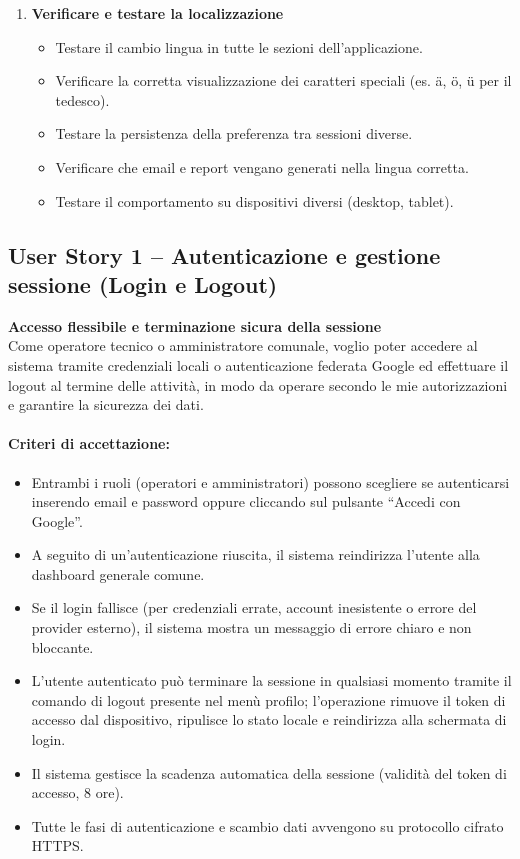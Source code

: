 \begin{enumerate}
    \item \textbf{Verificare e testare la localizzazione}
    \begin{itemize}
        \item Testare il cambio lingua in tutte le sezioni dell'applicazione.
        \item Verificare la corretta visualizzazione dei caratteri speciali (es. ä, ö, ü per il tedesco).
        \item Testare la persistenza della preferenza tra sessioni diverse.
        \item Verificare che email e report vengano generati nella lingua corretta.
        \item Testare il comportamento su dispositivi diversi (desktop, tablet).
    \end{itemize}
\end{enumerate}

\subsection{User Story 1 – Autenticazione e gestione sessione (Login e Logout)}
\label{us:login}

\textbf{Accesso flessibile e terminazione sicura della sessione} \\
Come operatore tecnico o amministratore comunale, voglio poter accedere al sistema tramite credenziali locali o autenticazione federata Google ed effettuare il logout al termine delle attività, in modo da operare secondo le mie autorizzazioni e garantire la sicurezza dei dati.

\paragraph*{Criteri di accettazione:}
\begin{itemize}
    \item Entrambi i ruoli (operatori e amministratori) possono scegliere se autenticarsi inserendo email e password oppure cliccando sul pulsante ``Accedi con Google''.
    \item A seguito di un'autenticazione riuscita, il sistema reindirizza l'utente alla dashboard generale comune.
    \item Se il login fallisce (per credenziali errate, account inesistente o errore del provider esterno), il sistema mostra un messaggio di errore chiaro e non bloccante.
    \item L'utente autenticato può terminare la sessione in qualsiasi momento tramite il comando di logout presente nel menù profilo; l'operazione rimuove il token di accesso dal dispositivo, ripulisce lo stato locale e reindirizza alla schermata di login.
    \item Il sistema gestisce la scadenza automatica della sessione (validità del token di accesso, 8 ore).
    \item Tutte le fasi di autenticazione e scambio dati avvengono su protocollo cifrato HTTPS.
\end{itemize}

